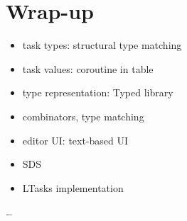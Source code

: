 \section{Wrap-up}\label{section-wrapup}
\begin{itemize}
    \item task types: structural type matching
    \item task values: coroutine in table
    \item type representation: Typed library
    \item combinators, type matching
    \item editor UI: text-based UI
    \item SDS
    \item LTasks implementation
\end{itemize}

\dots
